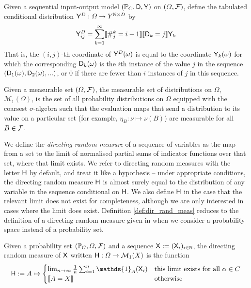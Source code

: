 \begin{definition}\label{def:tab_cd}
Given a sequential input-output model $(\mathbb{P}_C,\mathsf{D},\mathsf{Y})$ on $(\Omega,\mathcal{F})$, define the tabulated conditional distribution $\mathsf{Y}^D:\Omega\to Y^{\mathbb{N}\times D}$ by
\begin{align}
    \mathsf{Y}^D_{ij} = \sum_{k=1}^{\infty} \llbracket \#_j^k = i-1\rrbracket \llbracket \mathsf{D}_k = j \rrbracket \mathsf{Y}_k
\end{align}
That is, the $(i,j)$-th coordinate of $\mathsf{Y}^D(\omega)$ is equal to the coordinate $\mathsf{Y}_k(\omega)$ for which the corresponding $\mathsf{D}_k(\omega)$ is the $i$th instance of the value $j$ in the sequence $(\mathsf{D}_1(\omega),\mathsf{D}_2(\omega),...)$, or 0 if there are fewer than $i$ instances of $j$ in this sequence.
\end{definition}

\begin{definition}
Given a measurable set $(\Omega,\mathcal{F})$, the measurable set of distributions on $\Omega$, $\mathcal{M}_1(\Omega)$, is the set of all probability distributions on $\Omega$ equipped with the coarsest $\sigma$-algebra such that the evaluation maps that send a distribution to its value on a particular set (for example, $\eta_B:\nu\mapsto \nu(B)$) are measurable for all $B\in \mathcal{F}$.
\end{definition}

We define the \emph{directing random measure} of a sequence of variables as the map from a set to the limit of normalised partial sums of indicator functions over that set, where that limit exists. We refer to directing random measures with the letter $\mathsf{H}$ by default, and treat it like a hypothesis -- under appropriate conditions, the directing random measure $\mathsf{H}$ is almost surely equal to the distribution of any variable in the sequence conditional on $\mathsf{H}$. We also define $\mathsf{H}$ in the case that the relevant limit does not exist for completeness, although we are only interested in cases where the limit does exist. Definition \ref{def:dir_rand_meas} reduces to the definition of a directing random measure given in \citet{kallenberg_basic_2005} when we consider a probability space instead of a probability set.

\begin{definition}\label{def:dir_rand_meas}
Given a probability set $(\mathbb{P}_C,\Omega,\mathcal{F})$ and a sequence $\mathsf{X}:=(\mathsf{X}_i)_{i\in\mathbb{N}}$, the directing random measure of $\mathsf{X}$ written $\mathsf{H}:\Omega\to \mathcal{M}_1(X)$ is the function
\begin{align}
    \RV{H} := A \mapsto \begin{cases}
    \lim_{n\to \infty}\frac{1}{n} \sum_{i=1}^{n} \mathds{1}_{A}(\RV{X}_{i}) & \text{this limit exists for all }\alpha\in C\\
    \llbracket A = X \rrbracket &\text{otherwise}
    \end{cases} 
\end{align}
\end{definition}

